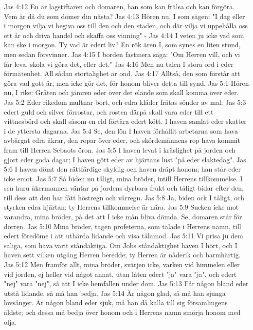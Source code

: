 Jas 4:12  En är lagstiftaren och domaren, han som kan frälsa och kan förgöra. Vem är då du som dömer din nästa?
Jas 4:13  Hören nu, I som sägen: "I dag eller i morgon vilja vi begiva oss till den och den staden, och där vilja vi uppehålla oss ett år och driva handel och skaffa oss vinning" -
Jas 4:14  I veten ju icke vad som kan ske i morgon. Ty vad är edert liv? En rök ären I, som synes en liten stund, men sedan försvinner.
Jas 4:15  I borden fastmera säga: "Om Herren vill, och vi får leva, skola vi göra det, eller det."
Jas 4:16  Men nu talen I stora ord i eder förmätenhet. All sådan stortalighet är ond.
Jas 4:17  Alltså, den som förstår att göra vad gott är, men icke gör det, för honom bliver detta till synd.
Jas 5:1  Hören nu, I rike: Gråten och jämren eder över det elände som skall komma över eder.
Jas 5:2  Eder rikedom multnar bort, och edra kläder frätas sönder av mal;
Jas 5:3  edert guld och silver förrostar, och rosten därpå skall vara eder till ett vittnesbörd och skall såsom en eld förtära edert kött. I haven samlat eder skatter i de yttersta dagarna.
Jas 5:4  Se, den lön I haven förhållit arbetarna som hava avbärgat edra åkrar, den ropar över eder, och skördemännens rop hava kommit fram till Herren Sebaots öron.
Jas 5:5  I haven levat i kräslighet på jorden och gjort eder goda dagar; I haven gött eder av hjärtans lust "på eder slaktedag".
Jas 5:6  I haven dömt den rättfärdige skyldig och haven dräpt honom; han står eder icke emot.
Jas 5:7  Så biden nu tåligt, mina bröder, intill Herrens tillkommelse. I sen huru åkermannen väntar på jordens dyrbara frukt och tåligt bidar efter den, till dess att den har fått höstregn och vårregn.
Jas 5:8  Ja, biden ock I tåligt, och styrken edra hjärtan; ty Herrens tillkommelse är nära.
Jas 5:9  Sucken icke mot varandra, mina bröder, på det att I icke mån bliva dömda. Se, domaren står för dörren.
Jas 5:10  Mina bröder, tagen profeterna, som talade i Herrens namn, till edert föredöme i att uthärda lidande och visa tålamod.
Jas 5:11  Vi prisa ju dem saliga, som hava varit ståndaktiga. Om Jobs ståndaktighet haven I hört, och I haven sett vilken utgång Herren beredde; ty Herren är nåderik och barmhärtig.
Jas 5:12  Men framför allt, mina bröder, svärjen icke, varken vid himmelen eller vid jorden, ej heller vid något annat, utan låten edert "ja" vara "ja", och edert "nej" vara "nej", så att I icke hemfallen under dom.
Jas 5:13  Får någon bland eder utstå lidande, så må han bedja.
Jas 5:14  Är någon glad, så må han sjunga lovsånger. Är någon bland eder sjuk, må han då kalla till sig församlingens äldste; och dessa må bedja över honom och i Herrens namn smörja honom med olja.
